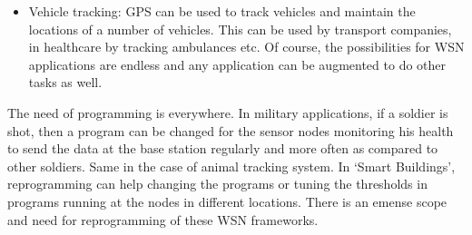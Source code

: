 \documentclass[twocolumn]{article}
\begin{document}
\begin{itemize}
\begin{itemize}
\item Vehicle tracking\cite{patwari2005locating}: GPS can be used to track vehicles and maintain the locations of a number of vehicles. This can be used by transport companies, in healthcare by tracking ambulances etc.
Of course, the possibilities for WSN applications are endless and any application can be augmented to do other tasks as well.
\end{itemize}
\end{itemize}

The need of programming is everywhere. In military applications, if a soldier is shot, then a program can be changed for the sensor nodes monitoring his health to send the data at the base station regularly and more often as compared to other soldiers. Same in the case of animal tracking system. In `Smart Buildings', reprogramming can help changing the programs or tuning the thresholds in programs running at the nodes in different locations. There is an emense scope and need for reprogramming of these WSN frameworks.
\end{document}
